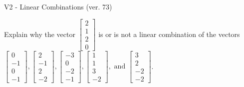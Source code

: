 \begin{exercise}
  \begin{exerciseTitle}V2 - Linear Combinations (ver. 73)\end{exerciseTitle}
  \begin{exerciseStatement}
    Explain why the vector \(\left[\begin{array}{c}
2 \\
1 \\
2 \\
0
\end{array}\right]\)  is or is not a linear 
	combination of the vectors \(\left[\begin{array}{c}
0 \\
-1 \\
0 \\
-1
\end{array}\right] , \left[\begin{array}{c}
2 \\
-1 \\
2 \\
-2
\end{array}\right] , \left[\begin{array}{c}
-3 \\
0 \\
-2 \\
-1
\end{array}\right] , \left[\begin{array}{c}
1 \\
1 \\
3 \\
-2
\end{array}\right] , \text{ and } \left[\begin{array}{c}
3 \\
2 \\
-2 \\
-2
\end{array}\right]\).
	



\end{exerciseStatement}
\end{exercise}
